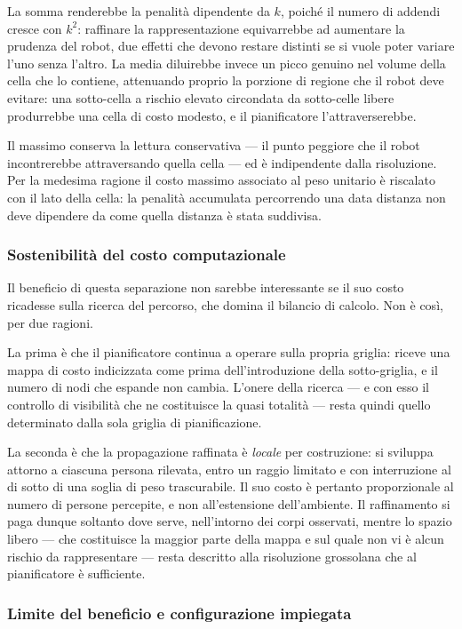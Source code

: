 La somma renderebbe la penalità dipendente da $k$, poiché il numero di addendi cresce con
$k^2$: raffinare la rappresentazione equivarrebbe ad aumentare la prudenza del robot, due
effetti che devono restare distinti se si vuole poter variare l'uno senza l'altro. La media
diluirebbe invece un picco genuino nel volume della cella che lo contiene, attenuando proprio
la porzione di regione che il robot deve evitare: una sotto-cella a rischio elevato circondata
da sotto-celle libere produrrebbe una cella di costo modesto, e il pianificatore
l'attraverserebbe.

Il massimo conserva la lettura conservativa — il punto peggiore che il robot incontrerebbe
attraversando quella cella — ed è indipendente dalla risoluzione. Per la medesima ragione il
costo massimo associato al peso unitario è riscalato con il lato della cella: la penalità
accumulata percorrendo una data distanza non deve dipendere da come quella distanza è stata
suddivisa.

\subsubsection{Sostenibilità del costo computazionale}

Il beneficio di questa separazione non sarebbe interessante se il suo costo ricadesse sulla
ricerca del percorso, che domina il bilancio di calcolo. Non è così, per due ragioni.

La prima è che il pianificatore continua a operare sulla propria griglia: riceve una mappa di
costo indicizzata come prima dell'introduzione della sotto-griglia, e il numero di nodi che
espande non cambia. L'onere della ricerca — e con esso il controllo di visibilità che ne
costituisce la quasi totalità — resta quindi quello determinato dalla sola griglia di
pianificazione.

La seconda è che la propagazione raffinata è \emph{locale} per costruzione: si sviluppa
attorno a ciascuna persona rilevata, entro un raggio limitato e con interruzione al di sotto
di una soglia di peso trascurabile. Il suo costo è pertanto proporzionale al numero di persone
percepite, e non all'estensione dell'ambiente. Il raffinamento si paga dunque soltanto dove
serve, nell'intorno dei corpi osservati, mentre lo spazio libero — che costituisce la maggior
parte della mappa e sul quale non vi è alcun rischio da rappresentare — resta descritto alla
risoluzione grossolana che al pianificatore è sufficiente.

\subsubsection{Limite del beneficio e configurazione impiegata}

